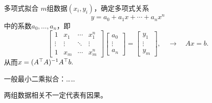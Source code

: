\begin{method}{多项式拟合}{}
	$m$组数据$(x_i,y_i)$，确定多项式关系
	\[
		y=a_0+a_1x+\cdots+a_nx^n
	\]
	中的系数$a_0,\ldots,a_n$，即 
	\[
		\begin{bmatrix}
			1&x_1&\cdots&x_1^n\\\vdots&\vdots&\ddots&\vdots\\1&x_m&\cdots&x_m^n
		\end{bmatrix}
		\begin{bmatrix}
			a_0\\\vdots\\a_n
		\end{bmatrix}=
		\begin{bmatrix}
			y_1\\\vdots\\y_m
		\end{bmatrix},\quad\rightarrow\quad Ax=b.
	\]
	从而$x=(A^\top A)^{-1} A^\top b.$
\end{method}
一般最小二乘拟合：……

两组数据相关不一定代表有因果。

